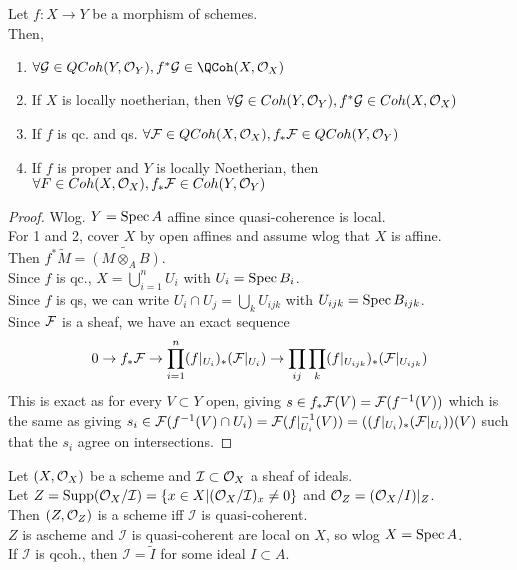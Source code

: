 \documentclass[../main.tex]{subfiles}
\begin{document}
\begin{propo}
Let $f:X\to Y$ be a morphism of schemes.\\
Then,
\begin{enumerate}
\item $\forall \G \in QCoh( Y,\O_Y) , f^{\ast }\G\in \QCoh( X,\O_X) $ 
\item If $X$ is locally noetherian, then  $\forall \mathcal{G} \in Coh( Y,\mathcal{O}_Y) , f^{\ast }\mathcal{G} \in Coh( X,\mathcal{O}_X) $
\item If $f$ is qc. and qs. $\forall \mathcal{F} \in QCoh( X,\mathcal{O}_X), f_\ast \mathcal{F} \in QCoh( Y,\mathcal{O}_Y) $ 
\item If $f$ is proper and $Y$ is locally Noetherian, then $\forall F\in Coh( X,\mathcal{O}_X), f_\ast \mathcal{F} \in Coh( Y,\mathcal{O}_Y) $ 
\end{enumerate}
\end{propo}
\begin{proof}
Wlog. $Y= \operatorname{Spec} A$ affine since quasi-coherence is local.\\
For 1 and 2, cover $X$ by open affines and assume wlog that $X$ is affine.\\
Then $f^{\ast} \widetilde{M} = \widetilde{( M\otimes_A B)}$.\\
Since $f$ is qc., $X= \bigcup_{i=1}^{n}U_i$ with $U_i = \operatorname{Spec} B_i$.\\
Since $f$ is qs, we can write $U_{i} \cap U_j= \bigcup_{k} U_{ij k} $ with $U_{ij k} = \operatorname{Spec} B_{ij k} $.\\
Since $\mathcal{F}$ is a sheaf, we have an exact sequence
\[ 
0\to f_\ast \mathcal{F} \to \prod_{i=1}^{n}( f|_{U_i} )_\ast ( \mathcal{F}|_{U_i} ) \to \prod_{ij} \prod_k ( f|_{U_{i j k} })_\ast ( \mathcal{F}|_{U_{i j k} } ) 
\]
This is exact as for every $V \subset Y$ open, giving $s\in f_\ast \mathcal{F}( V) = \mathcal{F}( f^{-1}( V) ) $ which is the same as giving $s_i \in \mathcal{F}( f^{-1}( V)\cap U_i ) = \mathcal{F}( f|_{U_i} ^{-1}( V) ) = (  ( f|_{U_i} )_\ast ( \mathcal{F}|_{U_i} ) ) ( V)  $ such that the $s_i$ agree on intersections.
\end{proof}
\begin{propo}
Let $( X,\mathcal{O}_X) $ be a scheme and $\mathcal{I} \subset \mathcal{O}_X$ a sheaf of ideals.\\
Let $Z= \operatorname{Supp}( \mathcal{O}_X /\mathcal{I}) = \left\{ x\in X | ( \mathcal{O}_X /\mathcal{I})_x \neq 0 \right\} $ and $\mathcal{O}_Z = ( \mathcal{O}_X /I) |_Z$.\\
Then $( Z,\mathcal{O}_Z) $ is a scheme iff $\mathcal{I}$ is quasi-coherent.\\
$Z$ is ascheme and $\mathcal{I}$ is quasi-coherent are local on $X$, so wlog $X= \operatorname{Spec} A$.\\
If $\mathcal{I}$ is qcoh., then $\mathcal{I}= \widetilde{I}$ for some ideal $I \subset A$.
\end{propo}



	
\end{document}

